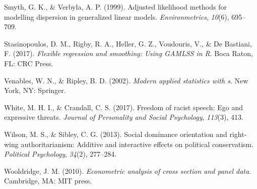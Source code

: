 \documentclass[english,man]{apa6}
\newcounter{author}
\theoremstyle{definition}
\theoremstyle{definition}
\theoremstyle{remark}
\begin{document}
\hypertarget{ref-smyth1999adjusted}{}
Smyth, G. K., \& Verbyla, A. P. (1999). Adjusted likelihood methods for
modelling dispersion in generalized linear models.
\emph{Environmetrics}, \emph{10}(6), 695--709.

\hypertarget{ref-stasinopoulos2017flexible}{}
Stasinopoulos, D. M., Rigby, R. A., Heller, G. Z., Voudouris, V., \& De
Bastiani, F. (2017). \emph{Flexible regression and smoothing: Using
GAMLSS in R}. Boca Raton, FL: CRC Press.

\hypertarget{ref-venables2002modern}{}
Venables, W. N., \& Ripley, B. D. (2002). \emph{Modern applied
statistics with s}. New York, NY: Springer.

\hypertarget{ref-white2017freedom}{}
White, M. H. I., \& Crandall, C. S. (2017). Freedom of racist speech:
Ego and expressive threats. \emph{Journal of Personality and Social
Psychology}, \emph{113}(3), 413.

\hypertarget{ref-wilson2013social}{}
Wilson, M. S., \& Sibley, C. G. (2013). Social dominance orientation and
right-wing authoritarianism: Additive and interactive effects on
political conservatism. \emph{Political Psychology}, \emph{34}(2),
277--284.

\hypertarget{ref-wooldridge2010econometric}{}
Wooldridge, J. M. (2010). \emph{Econometric analysis of cross section
and panel data}. Cambridge, MA: MIT press.
\end{document}
